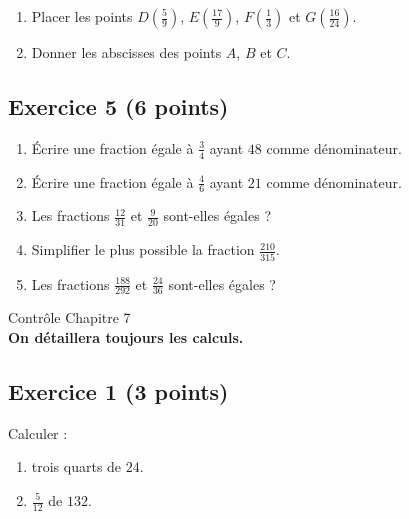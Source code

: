 \documentclass[14 pt]{extarticle}
\theoremstyle{plain}
\begin{document}
\begin{enumerate}
\item Placer les points $D\left(\frac59\right)$, $E\left(\frac{17}9\right)$, $F\left(\frac13\right)$ et $G\left(\frac{16}{24}\right)$.
\item Donner les abscisses des points $A$, $B$ et $C$.
\end{enumerate}  

\subsection*{Exercice 5 (6 points)}
 

\begin{enumerate}
\item Écrire une fraction égale à $\frac34$ ayant $48$ comme dénominateur.
\item Écrire une fraction égale à $\frac46$ ayant $21$ comme dénominateur.
\item Les fractions $\frac{12}{31}$ et $\frac{9}{20}$ sont-elles égales ?
\item Simplifier le plus possible la fraction $\frac{210}{315}$.
\item Les fractions $\frac{188}{292}$ et $\frac{24}{36}$ sont-elles égales ?
\end{enumerate}
\newpage

\begin{center}{\Large Contrôle Chapitre 7}\\ 
\textbf{On détaillera toujours les calculs.}
 \end{center}
 

\subsection*{Exercice 1 (3 points)}
Calculer :
\begin{enumerate}
\item trois quarts de $24$. 
\item $\frac{5}{12}$ de $132$.
\end{enumerate}
\end{document}
